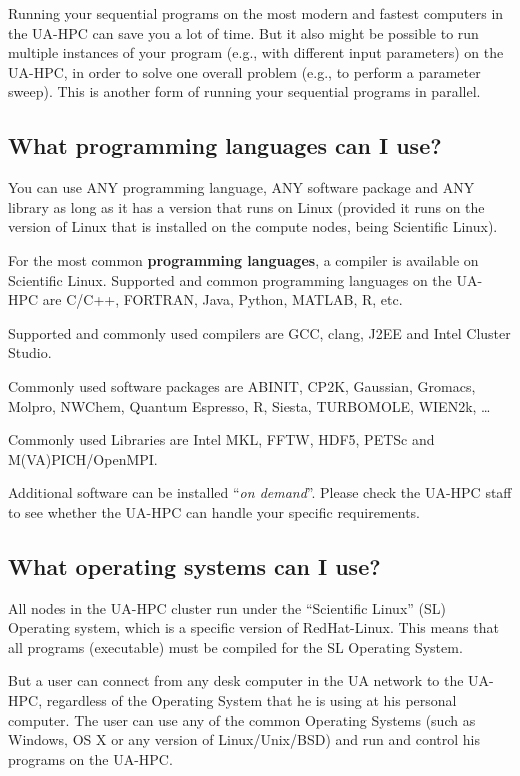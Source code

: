 Running your sequential programs on the most modern and fastest computers in
the UA-HPC can save you a lot of time.  But it also might be possible to run
multiple instances of your program (e.g., with different input parameters) on
the UA-HPC, in order to solve one overall problem (e.g., to perform a parameter
sweep). This is another form of running your sequential programs in parallel.

\subsection{What programming languages can I use?}
\label{sec:what-programming-languages-can-i-use}

You can use ANY programming language, ANY software package and ANY library as
long as it has a version that runs on Linux (provided it runs on the version of
Linux that is installed on the compute nodes, being Scientific Linux).

For the most common \textbf{programming languages}, a compiler is available on
Scientific Linux. Supported and common programming languages on the UA-HPC are
C/C++, FORTRAN, Java, Python, MATLAB, R, etc.

Supported and commonly used compilers are GCC, clang, J2EE and Intel Cluster
Studio.

Commonly used software packages are ABINIT, CP2K, Gaussian, Gromacs, Molpro,
NWChem, Quantum Espresso, R, Siesta, TURBOMOLE, WIEN2k, \ldots

Commonly used Libraries are Intel MKL, FFTW, HDF5, PETSc and M(VA)PICH/OpenMPI.

Additional software can be installed ``\textit{on demand}''. Please check the
UA-HPC staff to see whether the UA-HPC can handle your specific requirements.

\subsection{What operating systems can I use?}
\label{sec:what-operating-systems-can-i-use}

All nodes in the UA-HPC cluster run under the ``Scientific Linux'' (SL)
Operating system, which is a specific version of RedHat-Linux. This means that
all programs (executable) must be compiled for the SL Operating System.

But a user can connect from any desk computer in the UA network to the UA-HPC,
regardless of the Operating System that he is using at his personal computer.
The user can use any of the common Operating Systems (such as Windows, OS X or
any version of Linux/Unix/BSD) and run and control his programs on the UA-HPC.

